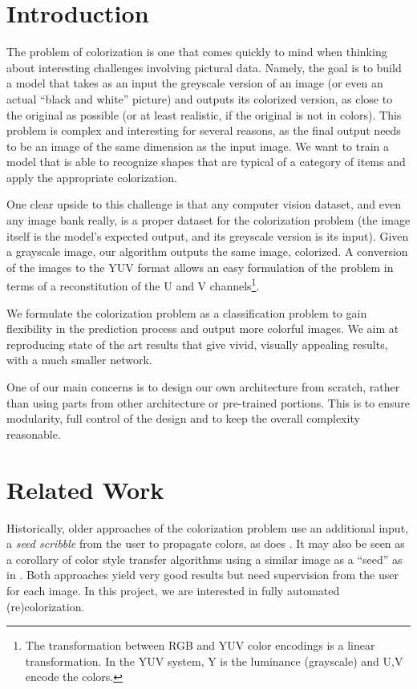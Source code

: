 \documentclass[10pt,twocolumn,letterpaper]{article}
\begin{document}
\section*{Introduction}

The problem of colorization is one that comes quickly to mind when thinking about interesting challenges involving pictural data. Namely, the goal is to build a model that takes as an input the greyscale version of an image (or even an actual ``black and white'' picture) and outputs its colorized version, as close to the original as possible (or at least realistic, if the original is not in colors). This problem is complex and interesting for several reasons, as the final output needs to be an image of the same dimension as the input image. We want to train a model that is able to recognize shapes that are typical of a category of items and apply the appropriate colorization.

One clear upside to this challenge is that any computer vision dataset, and even any image bank really, is a proper dataset for the colorization problem (the image itself is the model's expected output, and its greyscale version is its input).
Given a grayscale image, our algorithm outputs the same image, colorized. A conversion of the images to the YUV format allows an easy formulation of the problem in terms of a reconstitution of the U and V channels\footnote{The transformation between RGB and YUV color encodings is a linear transformation. In the YUV system, Y is the luminance (grayscale) and U,V encode the colors.}.

We formulate the colorization problem as a classification problem to gain flexibility in the prediction process and output more colorful images. We aim at reproducing state of the art results that give vivid, visually appealing results, with a much smaller network.

One of our main concerns is to design our own architecture from scratch, rather than using parts from other architecture or pre-trained portions. This is to ensure modularity, full control of the design and to keep the overall complexity reasonable.

\section{Related Work} \label{relatedwork}

Historically, older approaches of the colorization problem use an additional input, a \textit{seed scribble} from the user to propagate colors, as does \cite{levin2004colorization}. It may also be seen as a corollary of color style transfer algorithms using a similar image as a ``seed'' as in \cite{he2017neuralct}. Both approaches yield very good results but need supervision from the user for each image. In this project, we are interested in fully automated (re)colorization.
\end{document}
